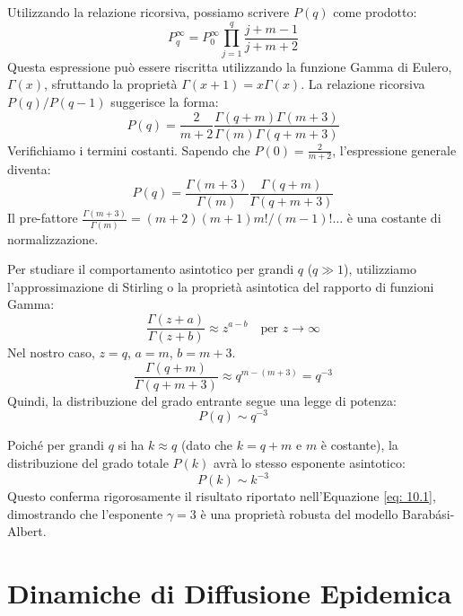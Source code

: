 Utilizzando la relazione ricorsiva, possiamo scrivere $P(q)$ come prodotto:
\begin{equation}
    P_q^\infty  = P_0^\infty  \prod_{j=1}^{q} \frac{j + m - 1}{j + m + 2}
\end{equation}
Questa espressione può essere riscritta utilizzando la funzione Gamma di Eulero, $\Gamma(x)$, sfruttando la proprietà $\Gamma(x+1) = x \Gamma(x)$.
La relazione ricorsiva $P(q) / P(q-1)$ suggerisce la forma:
\begin{equation}
    P(q) = \frac{2}{m+2} \frac{\Gamma(q+m) \Gamma(m+3)}{\Gamma(m) \Gamma(q+m+3)}
\end{equation}
Verifichiamo i termini costanti. Sapendo che $P(0) = \frac{2}{m+2}$, l'espressione generale diventa:
\begin{equation}
    P(q) = \frac{\Gamma(m+3)}{\Gamma(m)} \frac{\Gamma(q+m)}{\Gamma(q+m+3)}
\end{equation}
Il pre-fattore $\frac{\Gamma(m+3)}{\Gamma(m)} = (m+2)(m+1)m! / (m-1)! \dots$ è una costante di normalizzazione.

\noindent  Per studiare il comportamento asintotico per grandi $q$ ($q \gg 1$), utilizziamo l'approssimazione di Stirling o la proprietà asintotica del rapporto di funzioni Gamma:
\begin{equation}
    \frac{\Gamma(z+a)}{\Gamma(z+b)} \approx z^{a-b} \quad \text{per } z \to \infty
\end{equation}
Nel nostro caso, $z = q$, $a = m$, $b = m+3$.
\begin{equation}
    \frac{\Gamma(q+m)}{\Gamma(q+m+3)} \approx q^{m - (m+3)} = q^{-3}
\end{equation}
Quindi, la distribuzione del grado entrante segue una legge di potenza:
\begin{equation}
    P(q) \sim q^{-3}
\end{equation}

Poiché per grandi $q$ si ha $k \approx q$ (dato che $k = q+m$ e $m$ è costante), la distribuzione del grado totale $P(k)$ avrà lo stesso esponente asintotico:
\begin{equation}
    P(k) \sim k^{-3}
\end{equation}
Questo conferma rigorosamente il risultato riportato nell'Equazione \ref{eq: 10.1}, dimostrando che l'esponente $\gamma = 3$ è una proprietà robusta del modello Barabási-Albert.


\newpage
\section{Dinamiche di Diffusione Epidemica}

